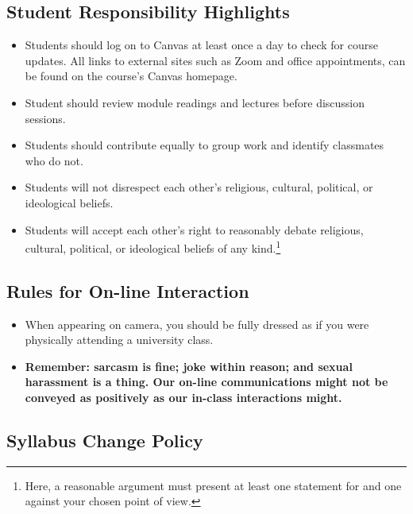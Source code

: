 \documentclass[10pt,]{article}
\providecommand{\tightlist}{%
  \setlength{\itemsep}{0pt}\setlength{\parskip}{0pt}}
\begin{document}
\hypertarget{student-responsibility-highlights}{%
\subsection{Student Responsibility
Highlights}\label{student-responsibility-highlights}}

\begin{itemize}
\tightlist
\item
  Students should log on to Canvas at least once a day to check for
  course updates. All links to external sites such as Zoom and office
  appointments, can be found on the course's Canvas homepage.
\item
  Student should review module readings and lectures before discussion
  sessions.
\item
  Students should contribute equally to group work and identify
  classmates who do not.
\item
  Students will not disrespect each other's religious, cultural,
  political, or ideological beliefs.
\item
  Students will accept each other's right to reasonably debate
  religious, cultural, political, or ideological beliefs of any
  kind.\footnote{Here, a reasonable argument must present at least one
    statement for and one against your chosen point of view.}
\end{itemize}

\hypertarget{rules-for-on-line-interaction}{%
\subsection{Rules for On-line
Interaction}\label{rules-for-on-line-interaction}}

\begin{itemize}
\tightlist
\item
  When appearing on camera, you should be fully dressed as if you were
  physically attending a university class.
\item
  \textbf{Remember: sarcasm is fine; joke within reason; and sexual
  harassment is a thing. Our on-line communications might not be
  conveyed as positively as our in-class interactions might.}
\end{itemize}

\hypertarget{syllabus-change-policy}{%
\subsection{Syllabus Change Policy}\label{syllabus-change-policy}}
\end{document}
